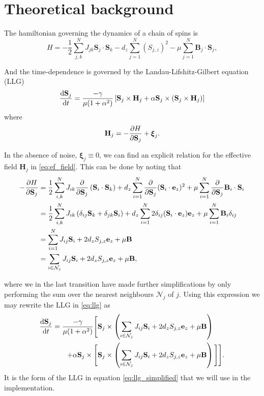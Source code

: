 \section{Theoretical background}

The hamiltonian governing the dynamics of a chain of spins is
\begin{equation}\label{eq:hamiltionian}
	H = - \frac{1}{2} \sum_{j,k}^{N} J_{jk} \mathbf{S}_j \cdot \mathbf{S}_k - d_z \sum_{j=1}^{N} (S_{j,z})^2 - \mu \sum_{j=1}^{N} \mathbf{B}_j \cdot \mathbf{S}_j,
\end{equation}

And the time-dependence is governed by the Landau-Lifshitz-Gilbert equation (LLG) 
\begin{equation}\label{eq:llg}
	\frac{\text{d} \mathbf{S}_j}{\text{d} t} = \frac{-\gamma}{\mu(1 + \alpha^2)} \left[ \mathbf{S}_j \times \mathbf{H}_j + \alpha \mathbf{S}_j \times (\mathbf{S}_j \times \mathbf{H}_j) \right]
\end{equation}
where
\begin{equation}\label{eq:ef_field}
	\mathbf{H}_j = -\frac{\partial H}{\partial \mathbf{S}_j} + \boldsymbol{\xi}_j.
\end{equation}

In the absence of noise, $\boldsymbol{\xi}_j \equiv 0$, we can find an explicit relation for the effective field $\mathbf{H}_j$ in \eqref{eq:ef_field}. This can be done by noting that 
\begin{align*}
	-\frac{\partial H}{\partial \mathbf{S}_j} &= \frac{1}{2}\sum_{i,k}^{N} J_{ik} \frac{\partial}{\partial \mathbf{S}_j} \left( \mathbf{S}_i \cdot \mathbf{S}_k \right) + d_z \sum_{i=1}^{N} \frac{\partial }{\partial \mathbf{S}_j}(\mathbf{S}_i \cdot \mathbf{e}_z)^2 + \mu \sum_{i=1}^{N} \frac{\partial }{\partial \mathbf{S}_j} \mathbf{B}_i \cdot \mathbf{S}_i \\
	&= \frac{1}{2}\sum_{i,k}^{N} J_{ik} \left( \delta_{ij} \mathbf{S}_k + \delta_{jk} \mathbf{S}_i \right) + d_z \sum_{i=1}^N 2 \delta_{ij} (\mathbf{S}_i \cdot \mathbf{e}_z) \mathbf{e}_z + \mu \sum_{i=1}^N \mathbf{B}_i \delta_{ij} \\
	&= \sum_{i=1}^N J_{ij} \mathbf{S}_i + 2d_z S_{j,z} \mathbf{e}_z + \mu \mathbf{B} \\
	&= \sum_{i \in \mathcal{N}_j} J_{ij} \mathbf{S}_i + 2d_z S_{j,z} \mathbf{e}_z + \mu \mathbf{B}, 
\end{align*}

where we in the last transition have made further simplifications by only performing the sum over the nearest neighbours $\mathcal{N}_j$ of $j$. Using this expression we may rewrite the LLG in \eqref{eq:llg} as
\begin{align}\label{eq:llg_simplified}
	\frac{\text{d} \mathbf{S}_j}{\text{d} t} = \frac{-\gamma}{\mu(1 + \alpha^2)} \Bigg[ \mathbf{S}_j &\times \left( \sum_{i \in \mathcal{N}_j} J_{ij} \mathbf{S}_i + 2d_z S_{j,z} \mathbf{e}_z + \mu \mathbf{B} \right) \nonumber \\
	+ \alpha \mathbf{S}_j \times \Bigg[  \mathbf{S}_j  &\times \left( \sum_{i \in \mathcal{N}_j} J_{ij} \mathbf{S}_i + 2d_z S_{j,z} \mathbf{e}_z + \mu \mathbf{B} \right) \Bigg] \Bigg]. 
\end{align}
It is the form of the LLG in equation \ref{eq:llg_simplified} that we will use in the implementation.